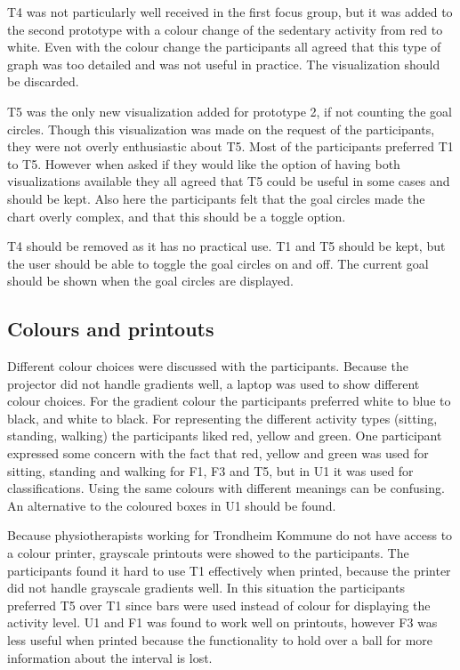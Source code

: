 T4 was not particularly well received in the first focus group, but it was added to the second prototype with a colour change of the sedentary activity from red to white. Even with the colour change the participants all agreed that this type of graph was too detailed and was not useful in practice. The visualization should be discarded.

T5 was the only new visualization added for prototype 2, if not counting the goal circles. Though this visualization was made on the request of the participants, they were not overly enthusiastic about T5. Most of the participants preferred T1 to T5. However when asked if they would like the option of having both visualizations available they all agreed that T5 could be useful in some cases and should be kept. Also here the participants felt that the goal circles made the chart overly complex, and that this should be a toggle option.

T4 should be removed as it has no practical use. T1 and T5 should be kept, but the user should be able to toggle the goal circles on and off. The current goal should be shown when the goal circles are displayed. 

\subsection{Colours and printouts}
Different colour choices were discussed with the participants. Because the projector did not handle gradients well, a laptop was used to show different colour choices. For the gradient colour the participants preferred white to blue to black, and white to black. For representing the different activity types (sitting, standing, walking) the participants liked red, yellow and green. One participant expressed some concern with the fact that red, yellow and green was used for sitting, standing and walking for F1, F3 and T5, but in U1 it was used for classifications. Using the same colours with different meanings can be confusing. An alternative to the coloured boxes in U1 should be found.

Because physiotherapists working for Trondheim Kommune do not have access to a colour printer, grayscale printouts were showed to the participants. The participants found it hard to use T1 effectively when printed, because the printer did not handle grayscale gradients well. In this situation the participants preferred T5 over T1 since bars were used instead of colour for displaying the activity level. U1 and F1 was found to work well on printouts, however F3 was less useful when printed because the functionality to hold over a ball for more information about the interval is lost.

